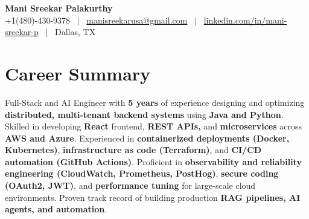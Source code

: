 \documentclass[a4paper,10pt]{article}
\begin{document}
\begin{center}
  {\LARGE \textbf{Mani Sreekar Palakurthy}} \\[4pt]
  {\small +1(480)-430-9378 \, $|$ \, \href{mailto:manisreekarusa@gmail.com}{manisreekarusa@gmail.com} \, $|$ \, \href{https://www.linkedin.com/in/mani-sreekar-p/}{linkedin.com/in/mani-sreekar-p} \, $|$ \, Dallas, TX}
\end{center}

\vspace{-4pt}

\section{Career Summary}
\small{Full-Stack and AI Engineer with \textbf{5 years} of experience designing and optimizing \textbf{distributed, multi-tenant backend systems} using \textbf{Java and Python}. Skilled in developing \textbf{React} frontend, \textbf{REST APIs,} and \textbf{microservices} across \textbf{AWS and Azure}. Experienced in \textbf{containerized deployments (Docker, Kubernetes)}, \textbf{infrastructure as code (Terraform)}, and \textbf{CI/CD automation (GitHub Actions)}. Proficient in \textbf{observability and reliability engineering (CloudWatch, Prometheus, PostHog)}, \textbf{secure coding (OAuth2, JWT)}, and \textbf{performance tuning} for large-scale cloud environments. Proven track record of building production \textbf{RAG pipelines, AI agents, and automation}.}

\vspace{3pt}
\end{document}

